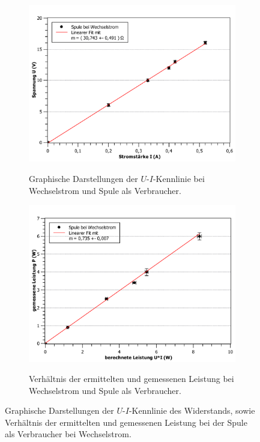 \begin{figure}[ht]
	\centering	
	\begin{subfigure}{0.70\textwidth}
		\centering
		\includegraphics[width=\textwidth]{auswertung/spule-wechsel-Widerstand.pdf}
		\label{fig:7}
		\caption{Graphische Darstellungen der $U$-$I$-Kennlinie bei Wechselstrom und Spule als Verbraucher.}	
	\end{subfigure}
	\begin{subfigure}{0.70\textwidth}
		\centering
		\includegraphics[width=\textwidth]{auswertung/spule-wechsel-Leistung.pdf}
		\label{fig:8}
		\caption{Verhältnis der ermittelten und gemessenen Leistung bei Wechselstrom und Spule als Verbraucher.}	
	\end{subfigure}
	\caption{Graphische Darstellungen der $U$-$I$-Kennlinie des Widerstands, sowie Verhältnis der ermittelten und gemessenen Leistung bei der Spule als Verbraucher bei Wechselstrom.}
\end{figure}

